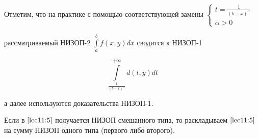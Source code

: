 \documentclass[../../main.tex]{subfiles}
\begin{document}
	Отметим, что на практике с помощью соответствующей замены 
	$\displaystyle 
	\left\{
		\begin{gathered}
			t = \frac{1}{(b - x)^\alpha} \\
			\alpha > 0
		\end{gathered}
	\right.
	$ 
	
	рассматриваемый НИЗОП-2 $\int\limits_a^b f(x, y) dx$ сводится к НИЗОП-1 
	
	\begin{equation}\label{lec11:6}
		\int\limits_{\frac{1}{(b - x)^\alpha}}^{+\infty} d(t, y) dt
	\end{equation}

	а далее используются доказательства НИЗОП-1.
	
	Если в $\eqref{lec11:5}$ получается НИЗОП смешанного типа, то раскладываем $\eqref{lec11:5}$ на сумму НИЗОП одного типа (первого либо второго).
	
\end{document}
